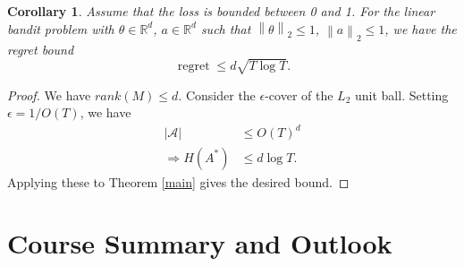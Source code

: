 \documentclass[11pt]{article}
\newtheorem{corollary}{Corollary}[theorem]
\DeclareMathOperator{\reg}{regret}
\newcommand{\norm}[1]{\left\lVert#1\right\rVert}
\begin{document}
\begin{corollary}
Assume that the loss is bounded between 0 and 1. For the linear bandit problem with $\theta \in \mathbb{R}^d$, $a \in \mathbb{R}^d$ such that $\norm{\theta}_2 \le 1$, $\norm{a}_2 \le 1$, we have the regret bound
\begin{equation*}
    \reg \le d\sqrt{T\log T}.
\end{equation*}
\end{corollary}
\begin{proof}
We have $rank(M) \le d$. Consider the $\epsilon$-cover of the $L_2$ unit ball. Setting $\epsilon = 1 / O(T)$, we have
\begin{align*}
    |\mathcal{A}| &\le O(T)^d \\
\Rightarrow H(A^*) &\le d\log T.
\end{align*}
Applying these to Theorem \ref{main} gives the desired bound.
\end{proof}

\section{Course Summary and Outlook}
\end{document}

